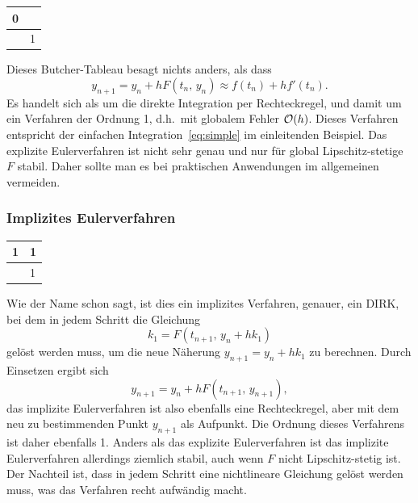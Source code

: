 \begin{center}
  \renewcommand{\arraystretch}{1.3}
  \begin{tabular}{r|l}
    0 & \\\hline
    & 1
  \end{tabular}
\end{center}
Dieses Butcher-Tableau besagt nichts anders, als dass
\begin{equation}
  y_{n+1} = y_n + h F(t_n,\, y_n) \approx f(t_n) + h f'(t_n).
\end{equation}
Es handelt sich als um die direkte Integration per Rechteckregel, und
damit um ein Verfahren der Ordnung 1, d.h.\ mit globalem Fehler
$\mathcal O(h)$. Dieses Verfahren entspricht der einfachen
Integration~\eqref{eq:simple} im einleitenden Beispiel. Das explizite
Eulerverfahren ist nicht sehr genau und nur für global
Lipschitz-stetige $F$ stabil. Daher sollte man es bei praktischen
Anwendungen im allgemeinen vermeiden.

\subsubsection{Implizites Eulerverfahren}

\begin{center}
  \renewcommand{\arraystretch}{1.3}
  \begin{tabular}{r|l}
    1 & 1\\\hline
    & 1
  \end{tabular}
\end{center}
Wie der Name schon sagt, ist dies ein implizites Verfahren, genauer,
ein DIRK, bei dem in jedem Schritt die Gleichung
\begin{equation}
  k_1 = F(t_{n+1},\,y_n + h k_1)
\end{equation}
gelöst werden muss, um die neue Näherung $y_{n+1} = y_n + h k_1$ zu
berechnen. Durch Einsetzen ergibt sich
\begin{equation}
  y_{n+1} = y_n + h F(t_{n+1},\, y_{n+1}),
\end{equation}
das implizite Eulerverfahren ist also ebenfalls eine Rechteckregel,
aber mit dem neu zu bestimmenden Punkt $y_{n+1}$ als Aufpunkt. Die
Ordnung dieses Verfahrens ist daher ebenfalls 1. Anders als das
explizite Eulerverfahren ist das implizite Eulerverfahren allerdings
ziemlich stabil, auch wenn $F$ nicht Lipschitz-stetig ist. Der
Nachteil ist, dass in jedem Schritt eine nichtlineare Gleichung gelöst
werden muss, was das Verfahren recht aufwändig macht.

